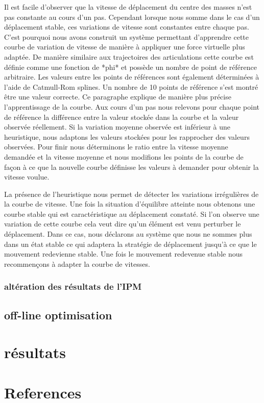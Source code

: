 \documentclass{llncs}
\begin{document}
Il est facile d'observer que la vitesse de déplacement du centre des masses n'est pas constante au cours d'un pas. Cependant lorsque nous somme dans le cas d'un déplacement stable, ces variations de vitesse sont constantes entre chaque pas. C'est pourquoi nous avons construit un système permettant d'apprendre cette courbe de variation de vitesse de manière à appliquer une force virtuelle plus adaptée. De manière similaire aux trajectoires des articulations cette courbe est définie comme une fonction de *phi* et possède un nombre de point de référence arbitraire. Les valeurs entre les points de références sont également déterminées à l'aide de Catmull-Rom splines. Un nombre de 10 points de référence s'est montré être une valeur correcte.
Ce paragraphe explique de manière plus précise l'apprentissage de la courbe. Aux cours d'un pas nous relevons pour chaque point de référence la différence entre la valeur stockée dans la courbe et la valeur observée réellement. Si la variation moyenne observée est inférieur à une heuristique, nous adaptons les valeurs stockées pour les rapprocher des valeurs observées. Pour finir nous déterminons le ratio entre la vitesse moyenne demandée et la vitesse moyenne et nous modifions les points de la courbe de façon à ce que la nouvelle courbe définisse les valeurs à demander pour obtenir la vitesse voulue.

La présence de l'heuristique nous permet de détecter les variations irrégulières de la courbe de vitesse. Une fois la situation d'équilibre atteinte nous obtenons une courbe stable qui est caractéristique au déplacement constaté. Si l'on observe une variation de cette courbe cela veut dire qu'un élément est venu perturber le déplacement. Dans ce cas, nous déclarons au système que nous ne sommes plus dans un état stable ce qui adaptera la stratégie de déplacement jusqu'à ce que le mouvement redevienne stable. Une fois le mouvement redevenue stable nous recommençons à adapter la courbe de vitesses.
%
\subsubsection{altération des résultats de l'IPM}

	
\subsection{off-line optimisation}




%
\section{résultats}
%

%
\section{References}
%

%
\nocite{*}


%
\end{document}
